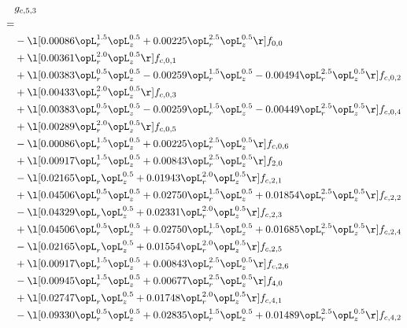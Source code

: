 \begin{alignat}{2} 
\label{eq:g_53_0} 
& g_{c,5,3} \nonumber \\ 
 = \\ 
& - \l[  0.00086 \opL_r^{1.5} \opL_z^{0.5} +  0.00225 \opL_r^{2.5} \opL_z^{0.5}  \r] f_{0,0} \nonumber \\ 
& + \l[  0.00361 \opL_r^{2.0} \opL_z^{0.5}  \r] f_{c,0,1} \nonumber \\ 
& + \l[  0.00383 \opL_r^{0.5} \opL_z^{0.5}   -0.00259 \opL_r^{1.5} \opL_z^{0.5}   -0.00494 \opL_r^{2.5} \opL_z^{0.5}  \r] f_{c,0,2} \nonumber \\ 
& + \l[  0.00433 \opL_r^{2.0} \opL_z^{0.5}  \r] f_{c,0,3} \nonumber \\ 
& + \l[  0.00383 \opL_r^{0.5} \opL_z^{0.5}   -0.00259 \opL_r^{1.5} \opL_z^{0.5}   -0.00449 \opL_r^{2.5} \opL_z^{0.5}  \r] f_{c,0,4} \nonumber \\ 
& + \l[  0.00289 \opL_r^{2.0} \opL_z^{0.5}  \r] f_{c,0,5} \nonumber \\ 
& - \l[  0.00086 \opL_r^{1.5} \opL_z^{0.5} +  0.00225 \opL_r^{2.5} \opL_z^{0.5}  \r] f_{c,0,6} \nonumber \\ 
& + \l[  0.00917 \opL_r^{1.5} \opL_z^{0.5} +  0.00843 \opL_r^{2.5} \opL_z^{0.5}  \r] f_{2,0} \nonumber \\ 
& - \l[  0.02165 \opL_r \opL_z^{0.5} +  0.01943 \opL_r^{2.0} \opL_z^{0.5}  \r] f_{c,2,1} \nonumber \\ 
& + \l[  0.04506 \opL_r^{0.5} \opL_z^{0.5} +  0.02750 \opL_r^{1.5} \opL_z^{0.5} +  0.01854 \opL_r^{2.5} \opL_z^{0.5}  \r] f_{c,2,2} \nonumber \\ 
& - \l[  0.04329 \opL_r \opL_z^{0.5} +  0.02331 \opL_r^{2.0} \opL_z^{0.5}  \r] f_{c,2,3} \nonumber \\ 
& + \l[  0.04506 \opL_r^{0.5} \opL_z^{0.5} +  0.02750 \opL_r^{1.5} \opL_z^{0.5} +  0.01685 \opL_r^{2.5} \opL_z^{0.5}  \r] f_{c,2,4} \nonumber \\ 
& - \l[  0.02165 \opL_r \opL_z^{0.5} +  0.01554 \opL_r^{2.0} \opL_z^{0.5}  \r] f_{c,2,5} \nonumber \\ 
& + \l[  0.00917 \opL_r^{1.5} \opL_z^{0.5} +  0.00843 \opL_r^{2.5} \opL_z^{0.5}  \r] f_{c,2,6} \nonumber \\ 
& - \l[  0.00945 \opL_r^{1.5} \opL_z^{0.5} +  0.00677 \opL_r^{2.5} \opL_z^{0.5}  \r] f_{4,0} \nonumber \\ 
& + \l[  0.02747 \opL_r \opL_z^{0.5} +  0.01748 \opL_r^{2.0} \opL_z^{0.5}  \r] f_{c,4,1} \nonumber \\ 
& - \l[  0.09330 \opL_r^{0.5} \opL_z^{0.5} +  0.02835 \opL_r^{1.5} \opL_z^{0.5} +  0.01489 \opL_r^{2.5} \opL_z^{0.5}  \r] f_{c,4,2} \nonumber \\ 

\end{alignat}
